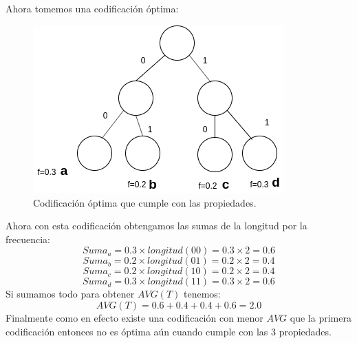 \documentclass[12pt]{article}
\begin{document}
\subsection{}
Ahora tomemos una codificación óptima:
\begin{figure}[h]
	\begin{center}
		\includegraphics[scale=0.5]{codificacion2}
	\end{center}
	\caption{Codificación óptima que cumple con las propiedades.}
\end{figure}
Ahora con esta codificación obtengamos las sumas de la longitud por la frecuencia:
\begin{equation}
Suma_a = 0.3 \times longitud(00) = 0.3 \times 2 = 0.6
\end{equation}
\begin{equation}
Suma_b = 0.2 \times longitud(01) = 0.2 \times 2 = 0.4
\end{equation}
\begin{equation}
Suma_c = 0.2 \times longitud(10) = 0.2 \times 2 = 0.4
\end{equation}
\begin{equation}
Suma_d = 0.3 \times longitud(11) = 0.3 \times 2 = 0.6
\end{equation}
Si sumamos todo para obtener $AVG(T)$ tenemos:
\begin{equation}
AVG(T)= 0.6 + 0.4 + 0.4  + 0.6 = 2.0
\end{equation}
Finalmente como en efecto existe una codificación con menor $AVG$ que la primera codificación entonces no es óptima aún cuando cumple con las 3 propiedades.
\end{document}
